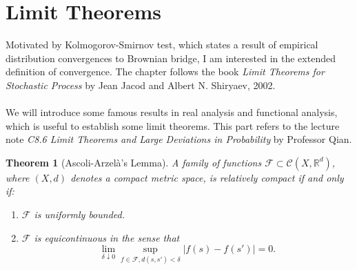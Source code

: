 \documentclass[11pt,english]{smfart}
\newtheorem{theorem}{Theorem}[subsection]
\newcommand{\mb}{\mathbb}
\newcommand{\mc}{\mathcal}
\begin{document}
\newpage
\section{Limit Theorems}
Motivated by Kolmogorov-Smirnov test, which states a result of empirical distribution convergences to Brownian bridge, I am interested in the extended definition of convergence. The chapter follows the book \textit{Limit Theorems for Stochastic Process} by Jean Jacod and Albert N. Shiryaev, 2002. \\
~\\
We will introduce some famous results in real analysis and functional analysis, which is useful to establish some limit theorems. This part refers to the lecture note \textit{C8.6 Limit Theorems and Large Deviations in Probability} by Professor Qian.\\

\begin{theorem}[Ascoli-Arzelà's Lemma]
    A family of functions $\mc{F} \subset \mc{C}(X,\mb{R}^d)$, where $(X,d)$ denotes a compact metric space, is relatively compact if and only if:\begin{enumerate}
        \item $\mc{F}$ is uniformly bounded.
        \item $\mc{F}$ is equicontinuous in the sense that $$\lim_{\delta \downarrow 0} \sup_{f\in \mc{F}, d(s,s')< \delta} |f(s) - f(s')| = 0.$$
    \end{enumerate}
\end{theorem}
\end{document}
